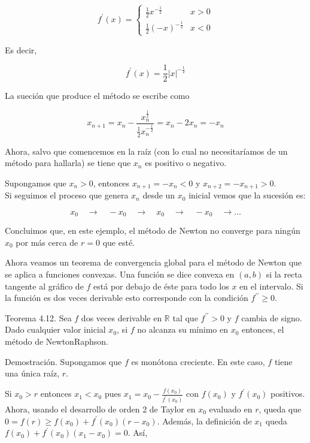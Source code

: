 \documentclass[10pt]{book}
\begin{document}
$$
f^{\prime}(x)= \begin{cases}\frac{1}{2} x^{-\frac{1}{2}} & x>0 \\ \frac{1}{2}(-x)^{-\frac{1}{2}} & x<0\end{cases}
$$

Es decir,

$$
f^{\prime}(x)=\frac{1}{2}|x|^{-\frac{1}{2}}
$$

La sueción que produce el método se escribe como

$$
x_{n+1}=x_{n}-\frac{x_{n}^{\frac{1}{2}}}{\frac{1}{2} x_{n}^{-\frac{1}{2}}}=x_{n}-2 x_{n}=-x_{n}
$$

Ahora, salvo que comencemos en la raíz (con lo cual no necesitaríamos de un método para hallarla) se tiene que $x_{n}$ es positivo o negativo.

Supongamos que $x_{n}>0$, entonces $x_{n+1}=-x_{n}<0$ y $x_{n+2}=-x_{n+1}>0$.\\
Si seguimos el proceso que genera $x_{n}$ desde un $x_{0}$ inicial vemos que la sucesión es:

$$
x_{0} \quad \rightarrow \quad-x_{0} \quad \rightarrow \quad x_{0} \quad \rightarrow \quad-x_{0} \quad \rightarrow \ldots
$$

Concluimos que, en este ejemplo, el método de Newton no converge para ningún $x_{0}$ por más cerca de $r=0$ que esté.

Ahora veamos un teorema de convergencia global para el método de Newton que se aplica a funciones convexas. Una función se dice convexa en $(a, b)$ si la recta tangente al gráfico de $f$ está por debajo de éste para todo los $x$ en el intervalo. Si la función es dos veces derivable esto corresponde con la condición $f^{\prime \prime} \geq 0$.

Teorema 4.12. Sea $f$ dos veces derivable en $\mathbb{R}$ tal que $f^{\prime \prime}>0$ y $f$ cambia de signo. Dado cualquier valor inicial $x_{0}$, si $f$ no alcanza su mínimo en $x_{0}$ entonces, el método de NewtonRaphson.

Demostración. Supongamos que $f$ es monótona creciente. En este caso, $f$ tiene una única raíz, $r$.

Si $x_{0}>r$ entonces $x_{1}<x_{0}$ pues $x_{1}=x_{0}-\frac{f\left(x_{0}\right)}{f^{\prime}\left(x_{0}\right)}$ con $f\left(x_{0}\right)$ y $f^{\prime}\left(x_{0}\right)$ positivos. Ahora, usando el desarrollo de orden 2 de Taylor en $x_{0}$ evaluado en $r$, queda que $0=f(r) \geq f\left(x_{0}\right)+f^{\prime}\left(x_{0}\right)\left(r-x_{0}\right)$. Además, la definición de $x_{1}$ queda $f\left(x_{0}\right)+f^{\prime}\left(x_{0}\right)\left(x_{1}-x_{0}\right)=0$. Así,
\end{document}
